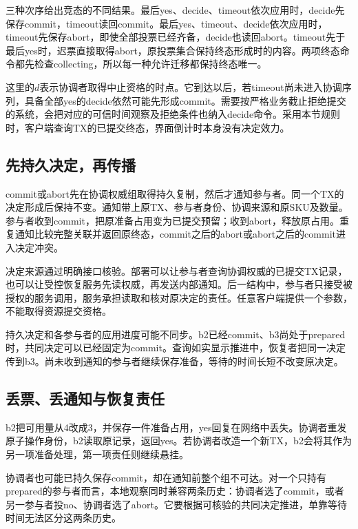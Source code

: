 三种次序给出竞态的不同结果。最后yes、decide、timeout依次应用时，decide先保存commit，timeout读回commit。最后yes、timeout、decide依次应用时，timeout先保存abort，即使全部投票已经齐备，decide也读回abort。timeout先于最后yes时，迟票直接取得abort，原投票集合保持终态形成时的内容。两项终态命令都先检查collecting，所以每一种允许迁移都保持终态唯一。


这里的$d$表示协调者取得中止资格的时点。它到达以后，若timeout尚未进入协调序列，具备全部yes的decide依然可能先形成commit。需要按严格业务截止拒绝提交的系统，会把对应的可信时间观察及拒绝条件也纳入decide命令。采用本节规则时，客户端查询TX的已提交终态，界面倒计时本身没有决定效力。

\subsection{先持久决定，再传播}


commit或abort先在协调权威组取得持久复制，然后才通知参与者。同一个TX的决定形成后保持不变。通知带上原TX、参与者身份、协调来源和原SKU及数量。参与者收到commit，把原准备占用变为已提交预留；收到abort，释放原占用。重复通知比较完整关联并返回原终态，commit之后的abort或abort之后的commit进入决定冲突。

决定来源通过明确接口核验。部署可以让参与者查询协调权威的已提交TX记录，也可以让受控恢复服务先读权威，再发送内部通知。后一结构中，参与者只接受被授权的服务调用，服务承担读取和核对原决定的责任。任意客户端提供一个参数，不能取得资源提交资格。

持久决定和各参与者的应用进度可能不同步。b2已经commit、b3尚处于prepared时，共同决定可以已经固定为commit。查询如实显示推进中，恢复者把同一决定传到b3。尚未收到通知的参与者继续保存准备，等待的时间长短不改变原决定。

\subsection{丢票、丢通知与恢复责任}

b2把可用量从4改成3，并保存一件准备占用，yes回复在网络中丢失。协调者重发原子操作身份，b2读取原记录，返回yes。若协调者改造一个新TX，b2会将其作为另一项准备处理，第一项责任则继续悬挂。

协调者也可能已持久保存commit，却在通知前整个组不可达。对一个只持有prepared的参与者而言，本地观察同时兼容两条历史：协调者选了commit，或者另一参与者投no、协调者选了abort。它要根据可核验的共同决定推进，单靠等待时间无法区分这两条历史。

